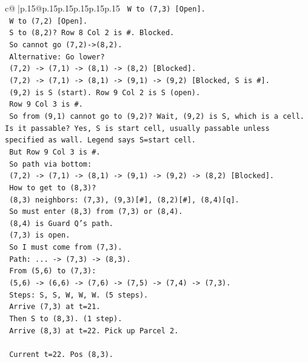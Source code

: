 \documentclass{article}
\begin{document}
{\begin{supertabular}{c@{$\;$}|p{.15\linewidth}@{}p{.15\linewidth}p{.15\linewidth}p{.15\linewidth}p{.15\linewidth}p{.15\linewidth}}
{{{\texttt{   W to (7,3) {[}Open{]}.} \\
\texttt{   W to (7,2) {[}Open{]}.} \\
\texttt{   S to (8,2)? Row 8 Col 2 is \#. Blocked.} \\
\texttt{   So cannot go (7,2){-}>(8,2).} \\
\texttt{   Alternative: Go lower?} \\
\texttt{   (7,2) {-}> (7,1) {-}> (8,1) {-}> (8,2) {[}Blocked{]}.} \\
\texttt{   (7,2) {-}> (7,1) {-}> (8,1) {-}> (9,1) {-}> (9,2) {[}Blocked, S is \#{]}.} \\
\texttt{   (9,2) is S (start). Row 9 Col 2 is S (open).} \\
\texttt{   Row 9 Col 3 is \#.} \\
\texttt{   So from (9,1) cannot go to (9,2)? Wait, (9,2) is S, which is a cell. Is it passable? Yes, S is start cell, usually passable unless specified as wall. Legend says S=start cell.} \\
\texttt{   But Row 9 Col 3 is \#.} \\
\texttt{   So path via bottom:} \\
\texttt{   (7,2) {-}> (7,1) {-}> (8,1) {-}> (9,1) {-}> (9,2) {-}> (8,2) {[}Blocked{]}.} \\
\texttt{   How to get to (8,3)?} \\
\texttt{   (8,3) neighbors: (7,3), (9,3){[}\#{]}, (8,2){[}\#{]}, (8,4){[}q{]}.} \\
\texttt{   So must enter (8,3) from (7,3) or (8,4).} \\
\texttt{   (8,4) is Guard Q's path.} \\
\texttt{   (7,3) is open.} \\
\texttt{   So I must come from (7,3).} \\
\texttt{   Path: ... {-}> (7,3) {-}> (8,3).} \\
\texttt{   From (5,6) to (7,3):} \\
\texttt{   (5,6) {-}> (6,6) {-}> (7,6) {-}> (7,5) {-}> (7,4) {-}> (7,3).} \\
\texttt{   Steps: S, S, W, W, W. (5 steps).} \\
\texttt{   Arrive (7,3) at t=21.} \\
\texttt{   Then S to (8,3). (1 step).} \\
\texttt{   Arrive (8,3) at t=22. Pick up Parcel 2.} \\
\\ 
\texttt{   Current t=22. Pos (8,3).} \\
}}}
\end{supertabular}}
\end{document}
